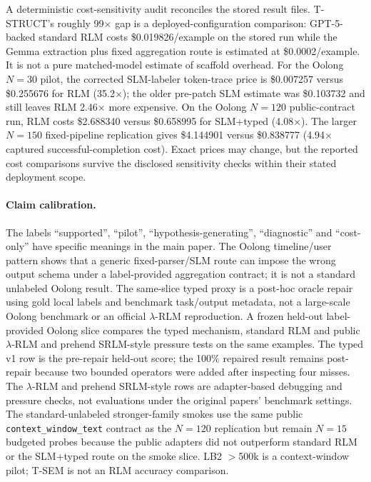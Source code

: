 \documentclass[letterpaper]{article}
\begin{document}
A deterministic cost-sensitivity audit reconciles the stored result files. T-STRUCT's roughly 99$\times$ gap is a deployed-configuration comparison: GPT-5-backed standard RLM costs \$0.019826/example on the stored run while the Gemma extraction plus fixed aggregation route is estimated at \$0.0002/example. It is not a pure matched-model estimate of scaffold overhead. For the Oolong $N=30$ pilot, the corrected SLM-labeler token-trace price is \$0.007257 versus \$0.255676 for RLM (35.2$\times$); the older pre-patch SLM estimate was \$0.103732 and still leaves RLM 2.46$\times$ more expensive. On the Oolong $N=120$ public-contract run, RLM costs \$2.688340 versus \$0.658995 for SLM+typed (4.08$\times$). The larger $N=150$ fixed-pipeline replication gives \$4.144901 versus \$0.838777 (4.94$\times$ captured successful-completion cost). Exact prices may change, but the reported cost comparisons survive the disclosed sensitivity checks within their stated deployment scope.

\paragraph{Claim calibration.}
The labels ``supported'', ``pilot'', ``hypothesis-generating'', ``diagnostic'' and ``cost-only'' have specific meanings in the main paper. The Oolong timeline/user pattern shows that a generic fixed-parser/SLM route can impose the wrong output schema under a label-provided aggregation contract; it is not a standard unlabeled Oolong result. The same-slice typed proxy is a post-hoc oracle repair using gold local labels and benchmark task/output metadata, not a large-scale Oolong benchmark or an official $\lambda$-RLM reproduction. A frozen held-out label-provided Oolong slice compares the typed mechanism, standard RLM and public $\lambda$-RLM and prehend SRLM-style pressure tests on the same examples. The typed v1 row is the pre-repair held-out score; the 100\% repaired result remains post-repair because two bounded operators were added after inspecting four misses. The $\lambda$-RLM and prehend SRLM-style rows are adapter-based debugging and pressure checks, not evaluations under the original papers' benchmark settings. The standard-unlabeled stronger-family smokes use the same public \texttt{context\_window\_text} contract as the $N{=}120$ replication but remain $N{=}15$ budgeted probes because the public adapters did not outperform standard RLM or the SLM+typed route on the smoke slice. LB2 $>$500k is a context-window pilot; T-SEM is not an RLM accuracy comparison.
\end{document}

